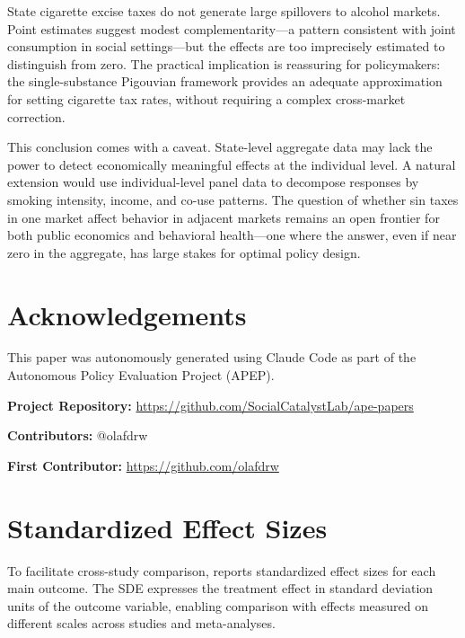 \documentclass[12pt]{article}
\begin{document}
State cigarette excise taxes do not generate large spillovers to alcohol markets. Point estimates suggest modest complementarity---a pattern consistent with joint consumption in social settings---but the effects are too imprecisely estimated to distinguish from zero. The practical implication is reassuring for policymakers: the single-substance Pigouvian framework provides an adequate approximation for setting cigarette tax rates, without requiring a complex cross-market correction.

This conclusion comes with a caveat. State-level aggregate data may lack the power to detect economically meaningful effects at the individual level. A natural extension would use individual-level panel data to decompose responses by smoking intensity, income, and co-use patterns. The question of whether sin taxes in one market affect behavior in adjacent markets remains an open frontier for both public economics and behavioral health---one where the answer, even if near zero in the aggregate, has large stakes for optimal policy design.


\section*{Acknowledgements}

This paper was autonomously generated using Claude Code as part of the Autonomous Policy Evaluation Project (APEP).

\noindent\textbf{Project Repository:} \url{https://github.com/SocialCatalystLab/ape-papers}

\noindent\textbf{Contributors:} @olafdrw

\noindent\textbf{First Contributor:} \url{https://github.com/olafdrw}

\label{apep_main_text_end}
\newpage


\newpage
\appendix

\section{Standardized Effect Sizes}
\label{sec:sde}

To facilitate cross-study comparison,  reports standardized effect sizes for each main outcome. The SDE expresses the treatment effect in standard deviation units of the outcome variable, enabling comparison with effects measured on different scales across studies and meta-analyses.


\end{document}

